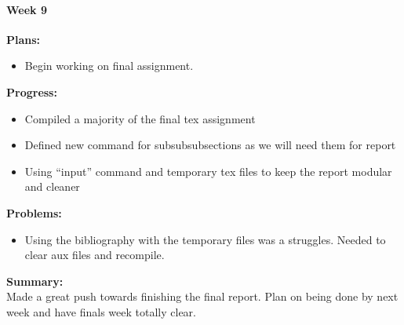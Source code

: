 \paragraph{Week 9}
\begin{adjustwidth}{2.5em}{0pt}
    \vspace{-0.5cm}\textbf{Plans:}
    \vspace{-0.5cm}
    \begin{itemize}
        \item Begin working on final assignment. 
    \end{itemize} 
    \vspace{-0.3cm}\textbf{Progress:}
    \vspace{-0.5cm}
    \begin{itemize}
        \item Compiled a majority of the final tex assignment
        \item Defined new command for subsubsubsections as we will need them for report
        \item Using ``input'' command and temporary tex files to keep the report modular and cleaner
    \end{itemize} 
    \vspace{-0.3cm}\textbf{Problems:}
    \vspace{-0.5cm}
    \begin{itemize}
        \item Using the bibliography with the temporary files was a struggles. Needed to clear aux files and recompile.
    \end{itemize}  
    \vspace{-0.3cm}\noindent\textbf{Summary:}\\
    \noindent Made a great push towards finishing the final report. Plan on being done by next week and have finals week totally clear.
\end{adjustwidth} 